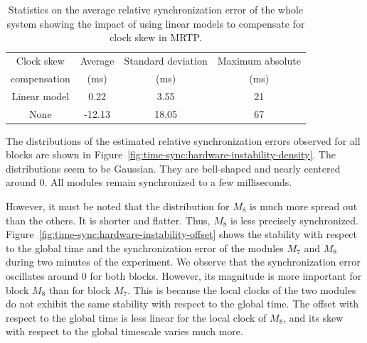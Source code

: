 \begin{table}[!h]
	\centering
	\small
	\begin{tabular}{|c|c|c|c|}
		\hline
		Clock skew & Average & Standard deviation & Maximum absolute \\
		compensation & (ms) & (ms) & (ms)\\
		\hline
		Linear model & 0.22 & 3.55 & 21 \\
		\hline
		None & -12.13 &  18.05 & 67 \\
		\hline
	\end{tabular}
	\caption{Statistics on the average relative synchronization error of the whole system showing the impact of using linear models to compensate for clock skew in MRTP.\label{table:time-sync:clock-skew-statistics}}
\end{table}

The distributions of the estimated relative synchronization errors observed for all blocks are shown in Figure~\ref{fig:time-sync:hardware-instability-density}. The distributions seem to be Gaussian. They are bell-shaped and nearly centered around 0. All modules remain synchronized to a few milliseconds.

However, it must be noted that the distribution for $M_8$ is much more spread out than the others. It is shorter and flatter. Thus, $M_8$ is less precisely synchronized. Figure~\ref{fig:time-sync:hardware-instability-offset} shows the stability with respect to the global time and the synchronization error of the modules $M_7$ and $M_8$ during two minutes of the experiment. We observe that the synchronization error oscillates around 0 for both blocks. However, its magnitude is more important for block $M_8$ than for block $M_7$. This is because the local clocks of the two modules do not exhibit the same stability with respect to the global time. The offset with respect to the global time is less linear for the local clock of $M_8$, and its skew with respect to the global timescale varies much more.

